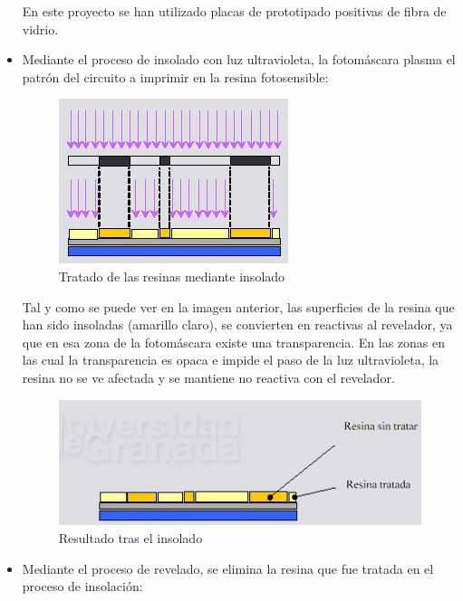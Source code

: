 \begin{itemize}
    En este proyecto se han utilizado placas de prototipado positivas de fibra de vidrio.
    
    \item Mediante el proceso de insolado con luz ultravioleta, la fotomáscara plasma el patrón del circuito a imprimir en la resina fotosensible:
    
    \begin{figure}[H]
    \centering 
    \includegraphics[width=0.65\linewidth]{pictures/Proceso2.JPG}
    \caption{Tratado de las resinas mediante insolado}
    \label{fig:kdiagram}
    \end{figure}
    
    Tal y como se puede ver en la imagen anterior, las superficies de la resina que han sido insoladas (amarillo claro), se convierten en reactivas al revelador, ya que en esa zona de la fotomáscara existe una transparencia. En las zonas en las cual la transparencia es opaca e impide el paso de la luz ultravioleta, la resina no se ve afectada y se mantiene no reactiva con el revelador.
    
    \begin{figure}[H]
    \centering 
    \includegraphics[width=0.8\linewidth]{pictures/Proceso3.JPG}
    \caption{Resultado tras el insolado}
    \label{fig:kdiagram}
    \end{figure}
    
    \item Mediante el proceso de revelado, se elimina la resina que fue tratada en el proceso de insolación:
    

\end{itemize}
